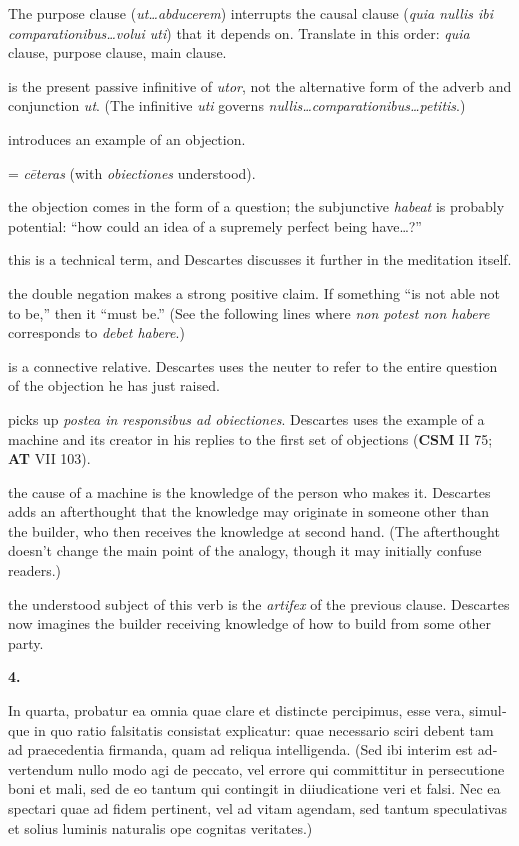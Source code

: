  The purpose clause (\textit{ut\dots abducerem}) interrupts the causal clause (\textit{quia nullis ibi comparationibus\dots volui uti}) that it depends on. Translate in this order: \textit{quia} clause, purpose clause, main clause.

 is the present passive infinitive of \textit{utor}, not the alternative form of the adverb and conjunction \textit{ut}. (The infinitive \textit{uti} governs \textit{nullis\dots comparationibus\dots petitis}.)

 introduces an example of an objection.

 = \textit{cēteras} (with \textit{obiectiones} understood).

 the objection comes in the form of a question; the subjunctive \textit{habeat} is probably potential: ``how could an idea of a supremely perfect being have\dots ?''

 this is a technical term, and Descartes discusses it further in the meditation itself.

 the double negation makes a strong positive claim. If something ``is not able not to be,'' then it ``must be.'' (See the following lines where \textit{non potest non habere} corresponds to \textit{debet habere}.)

 is a connective relative. Descartes uses the neuter to refer to the entire question of the objection he has just raised.

 picks up \textit{postea in responsibus ad obiectiones}. Descartes uses the example of a machine and its creator in his replies to the first set of objections (\textbf{CSM} II 75; \textbf{AT} VII 103).

 the cause of a machine is the knowledge of the person who makes it. Descartes adds an afterthought that the knowledge may originate in someone other than the builder, who then receives the knowledge at second hand. (The afterthought doesn't change the main point of the analogy, though it may initially confuse readers.)

 the understood subject of this verb is the \textit{artifex} of the previous clause. Descartes now imagines the builder receiving knowledge of how to build from some other party.

\clearpage

\beginnumbering
\pstart
\textbf{4.} \begin{latin}In quarta, probatur ea omnia quae clare et distincte percipimus, esse vera, simulque in quo ratio falsitatis consistat explicatur: quae necessario sciri debent tam ad praecedentia firmanda, quam ad reliqua intelligenda. (Sed ibi interim est advertendum nullo modo agi de peccato, vel errore qui committitur in persecutione boni et mali, sed de eo tantum qui contingit in diiudicatione veri et falsi. Nec ea spectari quae ad fidem pertinent, vel ad vitam agendam, sed tantum speculativas et solius luminis naturalis ope cognitas veritates.)\end{latin}
\pend
\endnumbering

